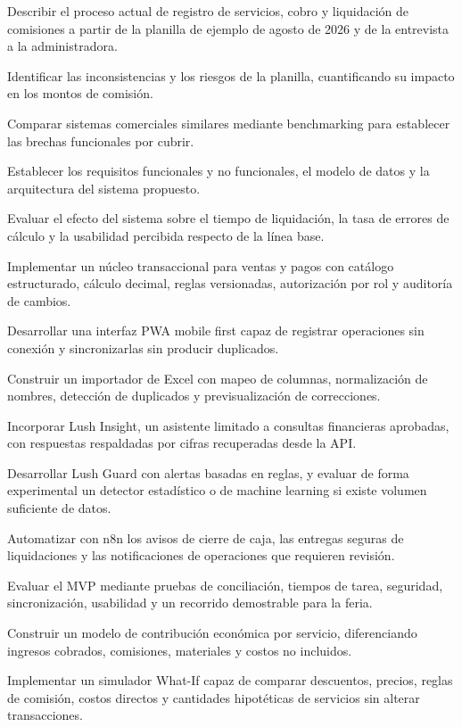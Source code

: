 \begin{vinetas}
\item Describir el proceso actual de registro de servicios, cobro y liquidación de comisiones a partir de la planilla de ejemplo de agosto de 2026 y de la entrevista a la administradora.
\item Identificar las inconsistencias y los riesgos de la planilla, cuantificando su impacto en los montos de comisión.
\item Comparar sistemas comerciales similares mediante benchmarking para establecer las brechas funcionales por cubrir.
\item Establecer los requisitos funcionales y no funcionales, el modelo de datos y la arquitectura del sistema propuesto.
\item Evaluar el efecto del sistema sobre el tiempo de liquidación, la tasa de errores de cálculo y la usabilidad percibida respecto de la línea base.
\item Implementar un núcleo transaccional para ventas y pagos con catálogo estructurado, cálculo decimal, reglas versionadas, autorización por rol y auditoría de cambios.
\item Desarrollar una interfaz PWA mobile first capaz de registrar operaciones sin conexión y sincronizarlas sin producir duplicados.
\item Construir un importador de Excel con mapeo de columnas, normalización de nombres, detección de duplicados y previsualización de correcciones.
\item Incorporar Lush Insight, un asistente limitado a consultas financieras aprobadas, con respuestas respaldadas por cifras recuperadas desde la API.
\item Desarrollar Lush Guard con alertas basadas en reglas, y evaluar de forma experimental un detector estadístico o de machine learning si existe volumen suficiente de datos.
\item Automatizar con n8n los avisos de cierre de caja, las entregas seguras de liquidaciones y las notificaciones de operaciones que requieren revisión.
\item Evaluar el MVP mediante pruebas de conciliación, tiempos de tarea, seguridad, sincronización, usabilidad y un recorrido demostrable para la feria.
\item Construir un modelo de contribución económica por servicio, diferenciando ingresos cobrados, comisiones, materiales y costos no incluidos.
\item Implementar un simulador What-If capaz de comparar descuentos, precios, reglas de comisión, costos directos y cantidades hipotéticas de servicios sin alterar transacciones.

\end{vinetas}
